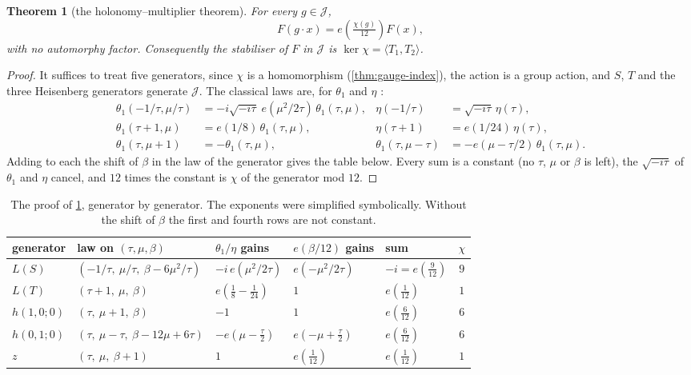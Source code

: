 \documentclass[11pt,a4paper]{article}
\theoremstyle{plain}
\newtheorem{theorem}{Theorem}
\theoremstyle{definition}
\begin{document}
\begin{theorem}[the holonomy--multiplier theorem]
\label{thm:theta}
For every $g\in\mathcal J$,
\[
  F(g\cdot x)=e\!\left(\tfrac{\chi(g)}{12}\right)F(x),
\]
with no automorphy factor. Consequently the stabiliser of $F$ in $\mathcal J$ is $\ker\chi=\langle T_1,T_2\rangle$.
\end{theorem}

\begin{proof}
It suffices to treat five generators, since $\chi$ is a homomorphism (\cref{thm:gauge-index}), the action is a group action,
and $S$, $T$ and the three Heisenberg generators generate $\mathcal J$. The classical laws are, for $\theta_1$ and $\eta$ \cite{Mumford}:
\begin{align*}
  \theta_1(-1/\tau,\mu/\tau)&=-i\sqrt{-i\tau}\;e(\mu^2/2\tau)\,\theta_1(\tau,\mu), & \eta(-1/\tau)&=\sqrt{-i\tau}\,\eta(\tau),\\
  \theta_1(\tau+1,\mu)&=e(1/8)\,\theta_1(\tau,\mu), & \eta(\tau+1)&=e(1/24)\,\eta(\tau),\\
  \theta_1(\tau,\mu+1)&=-\theta_1(\tau,\mu), & \theta_1(\tau,\mu-\tau)&=-e(\mu-\tau/2)\,\theta_1(\tau,\mu).
\end{align*}
Adding to each the shift of $\beta$ in the law of the generator gives the table below. Every sum is a constant (no $\tau$, $\mu$ or $\beta$ is left), the
$\sqrt{-i\tau}$ of $\theta_1$ and $\eta$ cancel, and $12$ times the constant is $\chi$ of the generator mod $12$.
\end{proof}

\begin{table}[htbp]
\centering
\begin{tabular}{@{}lllllc@{}}
\toprule
generator & law on $(\tau,\mu,\beta)$ & $\theta_1/\eta$ gains & $e(\beta/12)$ gains & sum & $\chi$ \\
\midrule
$L(S)$ & $(-1/\tau,\ \mu/\tau,\ \beta-6\mu^2/\tau)$ & $-i\,e(\mu^2/2\tau)$ & $e(-\mu^2/2\tau)$ & $-i=e(\tfrac9{12})$ & $9$ \\
$L(T)$ & $(\tau+1,\ \mu,\ \beta)$ & $e(\tfrac18-\tfrac1{24})$ & $1$ & $e(\tfrac1{12})$ & $1$ \\
$h(1,0;0)$ & $(\tau,\ \mu+1,\ \beta)$ & $-1$ & $1$ & $e(\tfrac6{12})$ & $6$ \\
$h(0,1;0)$ & $(\tau,\ \mu-\tau,\ \beta-12\mu+6\tau)$ & $-e(\mu-\tfrac\tau2)$ & $e(-\mu+\tfrac\tau2)$ & $e(\tfrac6{12})$ & $6$ \\
$z$ & $(\tau,\ \mu,\ \beta+1)$ & $1$ & $e(\tfrac1{12})$ & $e(\tfrac1{12})$ & $1$ \\
\bottomrule
\end{tabular}
\caption{The proof of \cref{thm:theta}, generator by generator. The exponents were simplified symbolically.
Without the shift of $\beta$ the first and fourth rows are not constant.}
\label{tab:theta}
\end{table}
\end{document}
